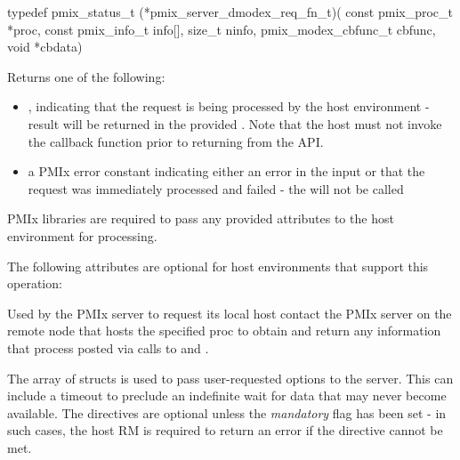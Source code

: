 \cspecificstart
\begin{codepar}
typedef pmix_status_t (*pmix_server_dmodex_req_fn_t)(
                             const pmix_proc_t *proc,
                             const pmix_info_t info[],
                             size_t ninfo,
                             pmix_modex_cbfunc_t cbfunc,
                             void *cbdata)
\end{codepar}
\cspecificend

\begin{arglist}
\end{arglist}

Returns one of the following:

\begin{itemize}
    \item {}, indicating that the request is being processed by the host environment - result will be returned in the provided . Note that the host must not invoke the callback function prior to returning from the \ac{API}.
    \item a PMIx error constant indicating either an error in the input or that the request was immediately processed and failed - the  will not be called
\end{itemize}

\reqattrstart
\ac{PMIx} libraries are required to pass any provided attributes to the host environment for processing.
\reqattrend

\optattrstart
The following attributes are optional for host environments that support this operation:


\optattrend

\descr

Used by the \ac{PMIx} server to request its local host contact the \ac{PMIx} server on the remote node that hosts the specified proc to obtain and return any information that process posted via calls to  and .

The array of  structs is used to pass user-requested options to the server.
This can include a timeout to preclude an indefinite wait for data that may never become available.
The directives are optional unless the \emph{mandatory} flag has been set - in such cases, the host \ac{RM} is required to return an error if the directive cannot be met.


